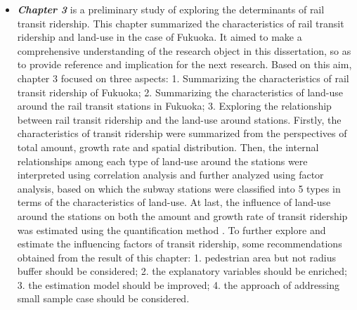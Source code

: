 \begin{itemize}
	\item \emph{\textbf{Chapter 3}} is a preliminary study of exploring the determinants of rail transit ridership. This chapter	summarized the characteristics of rail transit ridership and land-use in the case of Fukuoka. It aimed to make a comprehensive understanding of the research object in this dissertation, so as to provide reference and implication for the next research. Based on this aim, chapter 3 focused on three aspects: 1. Summarizing the characteristics of rail transit ridership of Fukuoka; 2. Summarizing the characteristics of land-use around the rail transit stations in Fukuoka; 3. Exploring the relationship between rail transit ridership and the land-use around stations. Firstly, the characteristics of transit ridership were summarized from the perspectives of total amount, growth rate and spatial distribution. Then, the internal relationships among each type of land-use around the stations were interpreted using correlation analysis and further analyzed using factor analysis, based on which the subway stations were classified into 5 types in terms of the characteristics of land-use. At last, the influence of land-use around the stations on both the amount and growth rate of transit ridership was estimated using the quantification method \uppercase\expandafter{}. To further explore and estimate the influencing factors of transit ridership, some recommendations obtained from the result of this chapter: 1. pedestrian area but not radius buffer should be considered; 2. the explanatory variables should be enriched; 3. the estimation model should be improved; 4. the approach of addressing small sample case should be considered.
	

\end{itemize}
